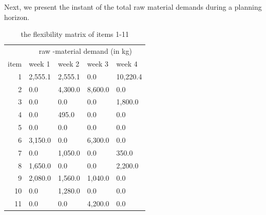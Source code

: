 \documentclass[preprint, 3p,
authoryear]{elsarticle} %
\begin{document}
Next, we present the instant of the total raw material demands during a
planning horizon.

\begin{table}[!h]

\caption{\label{tab:unnamed-chunk-6}the flexibility matrix of items 1-11}
\centering
\begin{tabular}[t]{r|l|l|l|l}
\hline
\multicolumn{1}{c|}{ } & \multicolumn{4}{c}{raw -material demand (in kg)} \\
\cline{2-5}
item & week 1 & week 2 & week 3 & week 4\\
\hline
1 & 2,555.1 & 2,555.1 & 0.0 & 10,220.4\\
\hline
2 & 0.0 & 4,300.0 & 8,600.0 & 0.0\\
\hline
3 & 0.0 & 0.0 & 0.0 & 1,800.0\\
\hline
4 & 0.0 & 495.0 & 0.0 & 0.0\\
\hline
5 & 0.0 & 0.0 & 0.0 & 0.0\\
\hline
6 & 3,150.0 & 0.0 & 6,300.0 & 0.0\\
\hline
7 & 0.0 & 1,050.0 & 0.0 & 350.0\\
\hline
8 & 1,650.0 & 0.0 & 0.0 & 2,200.0\\
\hline
9 & 2,080.0 & 1,560.0 & 1,040.0 & 0.0\\
\hline
10 & 0.0 & 1,280.0 & 0.0 & 0.0\\
\hline
11 & 0.0 & 0.0 & 4,200.0 & 0.0\\
\hline
\end{tabular}
\end{table}

\newpage
\end{document}
